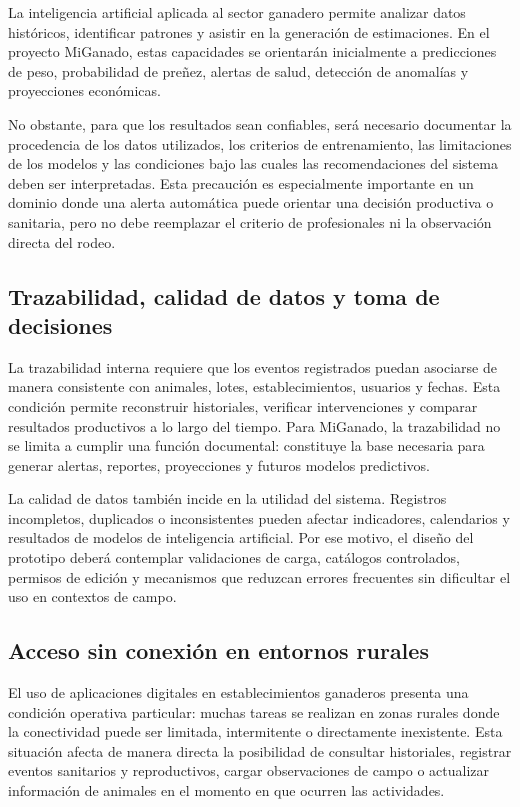 La inteligencia artificial aplicada al sector ganadero permite analizar datos hist\'oricos, identificar patrones y asistir en la generaci\'on de estimaciones. En el proyecto MiGanado, estas capacidades se orientar\'an inicialmente a predicciones de peso, probabilidad de pre\~nez, alertas de salud, detecci\'on de anomal\'ias y proyecciones econ\'omicas.

No obstante, para que los resultados sean confiables, ser\'a necesario documentar la procedencia de los datos utilizados, los criterios de entrenamiento, las limitaciones de los modelos y las condiciones bajo las cuales las recomendaciones del sistema deben ser interpretadas. Esta precauci\'on es especialmente importante en un dominio donde una alerta autom\'atica puede orientar una decisi\'on productiva o sanitaria, pero no debe reemplazar el criterio de profesionales ni la observaci\'on directa del rodeo.

\subsection{Trazabilidad, calidad de datos y toma de decisiones}

La trazabilidad interna requiere que los eventos registrados puedan asociarse de manera consistente con animales, lotes, establecimientos, usuarios y fechas. Esta condici\'on permite reconstruir historiales, verificar intervenciones y comparar resultados productivos a lo largo del tiempo. Para MiGanado, la trazabilidad no se limita a cumplir una funci\'on documental: constituye la base necesaria para generar alertas, reportes, proyecciones y futuros modelos predictivos.

La calidad de datos tambi\'en incide en la utilidad del sistema. Registros incompletos, duplicados o inconsistentes pueden afectar indicadores, calendarios y resultados de modelos de inteligencia artificial. Por ese motivo, el dise\~no del prototipo deber\'a contemplar validaciones de carga, cat\'alogos controlados, permisos de edici\'on y mecanismos que reduzcan errores frecuentes sin dificultar el uso en contextos de campo.

\subsection{Acceso sin conexi\'on en entornos rurales}

El uso de aplicaciones digitales en establecimientos ganaderos presenta una condici\'on operativa particular: muchas tareas se realizan en zonas rurales donde la conectividad puede ser limitada, intermitente o directamente inexistente. Esta situaci\'on afecta de manera directa la posibilidad de consultar historiales, registrar eventos sanitarios y reproductivos, cargar observaciones de campo o actualizar informaci\'on de animales en el momento en que ocurren las actividades.


